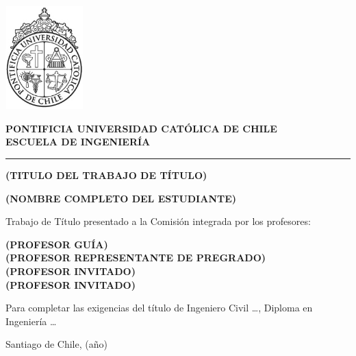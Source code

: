 \begin{flushleft}
    \begin{minipage}{0.2\textwidth}
        \centering
        \includegraphics[width=3cm]{content/logo.png}
    \end{minipage}%
    \begin{minipage}{0.7\textwidth}
        \vspace*{0.5cm} %
        \centering
        \textbf{PONTIFICIA UNIVERSIDAD CATÓLICA DE CHILE}\\
        \textbf{ESCUELA DE INGENIERÍA}
    \end{minipage}
\end{flushleft}

\vspace{1cm}
\hrule

\vspace{4cm}

\begin{center}
    {\LARGE\textbf{(TITULO DEL TRABAJO DE TÍTULO)}}

    \vspace{2cm}
    {\large\textbf{(NOMBRE COMPLETO DEL ESTUDIANTE)}}
\end{center}

\vspace{2cm}

Trabajo de Título presentado a la Comisión integrada por los profesores:

\textbf{(PROFESOR GUÍA)}\\

\textbf{(PROFESOR REPRESENTANTE DE PREGRADO)}\\

\textbf{(PROFESOR INVITADO)}\\

\textbf{(PROFESOR INVITADO)}
\vspace{1cm}

Para completar las exigencias del título de
Ingeniero Civil …, Diploma en Ingeniería …



\vfill
Santiago de Chile, (año)
\newpage
